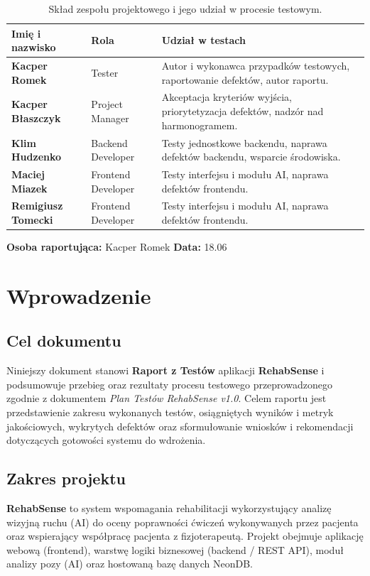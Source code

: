 \documentclass[11pt,a4paper]{article}
\newcommand{\sysname}{\textbf{RehabSense}}
\begin{document}
\begin{table}[h]
\centering
\begin{tabularx}{\textwidth}{>{\bfseries}p{4cm} p{3.5cm} Y}
\toprule
\textbf{Imię i nazwisko} & \textbf{Rola} & \textbf{Udział w testach} \\
\midrule
Kacper Romek & Tester & Autor i wykonawca przypadków testowych, raportowanie defektów, autor raportu. \\
Kacper Błaszczyk & Project Manager & Akceptacja kryteriów wyjścia, priorytetyzacja defektów, nadzór nad harmonogramem. \\
Klim Hudzenko & Backend Developer & Testy jednostkowe backendu, naprawa defektów backendu, wsparcie środowiska. \\
Maciej Miazek & Frontend Developer & Testy interfejsu i modułu AI, naprawa defektów frontendu. \\
Remigiusz Tomecki & Frontend Developer & Testy interfejsu i modułu AI, naprawa defektów frontendu. \\
\bottomrule
\end{tabularx}
\caption{Skład zespołu projektowego i jego udział w procesie testowym.}
\end{table}

\vspace{0.5cm}
\noindent\textbf{Osoba raportująca:} Kacper Romek \quad\textbf{Data:} 18.06

\newpage

\tableofcontents
\newpage

\section{Wprowadzenie}

\subsection{Cel dokumentu}
Niniejszy dokument stanowi \textbf{Raport z Testów} aplikacji \sysname{} i podsumowuje przebieg oraz rezultaty procesu testowego przeprowadzonego zgodnie z dokumentem \textit{Plan Testów RehabSense v1.0}. Celem raportu jest przedstawienie zakresu wykonanych testów, osiągniętych wyników i metryk jakościowych, wykrytych defektów oraz sformułowanie wniosków i rekomendacji dotyczących gotowości systemu do wdrożenia.

\subsection{Zakres projektu}
\sysname{} to system wspomagania rehabilitacji wykorzystujący analizę wizyjną ruchu (AI) do oceny poprawności ćwiczeń wykonywanych przez pacjenta oraz wspierający współpracę pacjenta z fizjoterapeutą. Projekt obejmuje aplikację webową (frontend), warstwę logiki biznesowej (backend / REST API), moduł analizy pozy (AI) oraz hostowaną bazę danych NeonDB.
\end{document}
